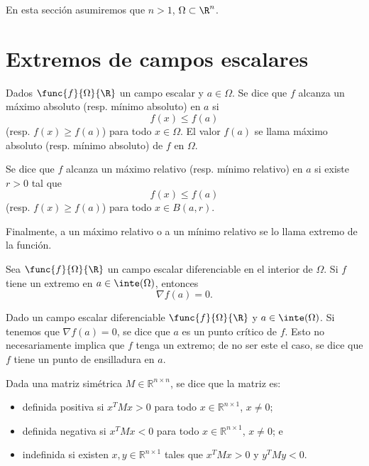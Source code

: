 \documentclass[a4,11pt]{aleph-notas}
\begin{document}
\encabezado

En esta sección asumiremos que $n>1$, $\Omega\subset \R^n$.

\section{Extremos de campos escalares}

\begin{defi}
    Dados $\func{f}{\Omega}{\R}$ un campo escalar y $a\in \Omega$. Se dice que $f$ alcanza un máximo absoluto (resp. mínimo absoluto) en $a$ si
    \[
        f(x) \leq f(a)
    \]
    (resp. $f(x) \geq f(a)$) para todo $x\in \Omega$. El valor $f(a)$ se llama máximo absoluto (resp. mínimo absoluto) de $f$ en $\Omega$.

    Se dice que $f$ alcanza un máximo relativo (resp. mínimo relativo) en $a$ si existe $r>0$ tal que
    \[
        f(x) \leq f(a)
    \]
    (resp. $f(x) \geq f(a)$) para todo $x\in B(a,r)$.

    Finalmente, a un máximo relativo o a un mínimo relativo se lo llama extremo de la función.
\end{defi}

\begin{teo}
    Sea $\func{f}{\Omega}{\R}$ un campo escalar diferenciable en el interior de $\Omega$. Si $f$ tiene un extremo en $a\in\inte(\Omega)$, entonces
    \[
        \nabla f(a) = 0.
    \]
\end{teo}

\begin{advertencia}
    Dado un campo escalar diferenciable $\func{f}{\Omega}{\R}$ y $a\in\inte(\Omega)$. Si tenemos que $\nabla f(a)=0$, se dice que $a$ es un punto crítico de $f$. Esto no necesariamente implica que $f$ tenga un extremo; de no ser este el caso, se dice que $f$ tiene un punto de ensilladura en $a$.
\end{advertencia}

\begin{defi}
    Dada una matriz simétrica $M\in \mathbb{R}^{n\times n}$, se dice que la matriz es:
    \begin{itemize}
        \item definida positiva si $x^TMx>0$ para todo $x\in \mathbb{R}^{n\times 1}$, $x\neq 0$;
        \item definida negativa si $x^TMx<0$ para todo $x\in \mathbb{R}^{n\times 1}$, $x\neq 0$; e
        \item indefinida si existen $x,y\in \mathbb{R}^{n\times 1}$ tales que $x^TMx>0$ y $y^TMy<0$.
    \end{itemize}
\end{defi}
\end{document}
